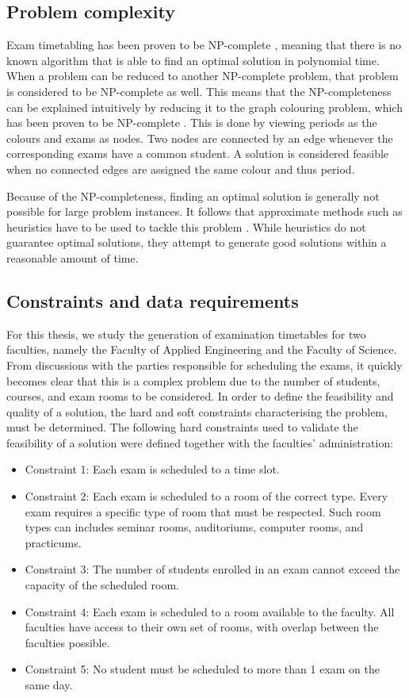 \subsection{Problem complexity}

Exam timetabling has been proven to be NP-complete \cite{even1976}, meaning that there is no known algorithm that is able to find an optimal solution in polynomial time. When a problem can be reduced to another NP-complete problem, that problem is considered to be NP-complete as well. This means that the NP-completeness can be explained intuitively by reducing it to the graph colouring problem, which has been proven to be NP-complete \cite{karp1972}. This is done by viewing periods as the colours and exams as nodes. Two nodes are connected by an edge whenever the corresponding exams have a common student. A solution is considered feasible when no connected edges are assigned the same colour and thus period. 

Because of the NP-completeness, finding an optimal solution is generally not possible for large problem instances. It follows that approximate methods such as heuristics have to be used to tackle this problem \cite{farreny1986}. While heuristics do not guarantee optimal solutions, they attempt to generate good solutions within a reasonable amount of time.



\subsection{Constraints and data requirements}

For this thesis, we study the generation of examination timetables for two faculties, namely the Faculty of Applied Engineering and the Faculty of Science. From discussions with the parties responsible for scheduling the exams, it quickly becomes clear that this is a complex problem due to the number of students, courses, and exam rooms to be considered. In order to define the feasibility and quality of a solution, the hard and soft constraints characterising the problem, must be determined. The following hard constraints used to validate the feasibility of a solution were defined together with the faculties' administration:

\begin{itemize}
    \item Constraint 1: Each exam is scheduled to a time slot.
    \item Constraint 2: Each exam is scheduled to a room of the correct type. Every exam requires a specific type of room that must be respected. Such room types can includes seminar rooms, auditoriums, computer rooms, and practicums.
    \item Constraint 3: The number of students enrolled in an exam cannot exceed the capacity of the scheduled room.
    \item Constraint 4: Each exam is scheduled to a room available to the faculty. All faculties have access to their own set of rooms, with overlap between the faculties possible.
    \item Constraint 5: No student must be scheduled to more than 1 exam on the same day.
\end{itemize}

